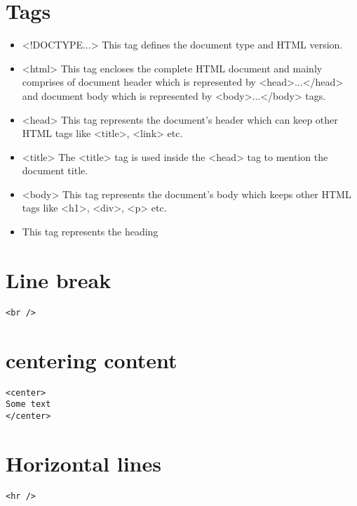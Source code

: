 \documentclass{report}
\begin{document}
    \section{\LARGE Tags}
    \bigbreak \noindent 
    \begin{itemize}
        \item <!DOCTYPE...> This tag defines the document type and HTML version.
        \item <html> This tag encloses the complete HTML document and mainly comprises of document header which is represented by <head>...</head> and document body which is represented by <body>...</body> tags.
        \item <head> This tag represents the document's header which can keep other HTML tags like <title>, <link> etc.
        \item <title> The <title> tag is used inside the <head> tag to mention the document title.
        \item <body> This tag represents the document's body which keeps other HTML tags like <h1>, <div>, <p> etc.
        \item <h1> This tag represents the heading
    \end{itemize}

    \bigbreak \noindent 
    \section{\LARGE Line break}
    \sepline
    \begin{verbatim}
<br /> 
    \end{verbatim}
    \sepline
    \bigbreak \noindent 
    \section{\LARGE centering content}
    \bigbreak \noindent 
    \sepline
    \begin{verbatim}
<center>
Some text
</center>
    \end{verbatim}
    \sepline

    \pagebreak \bigbreak \noindent 
    \section{\LARGE Horizontal lines}
    \bigbreak \noindent 
    \sepline
    \begin{verbatim}
<hr />
    \end{verbatim}
    \sepline
\end{document}
